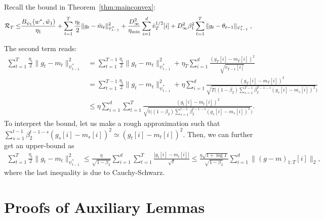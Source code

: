 \documentclass[11pt]{article}
\makeatletter
\renewenvironment{proof}[1][\proofname]{%
   \par\pushQED{\qed}\normalfont%
   \topsep6\p@\@plus6\p@\relax
   \trivlist\item[\hskip\labelsep\bfseries#1]%
   \ignorespaces
}{%
   \popQED\endtrivlist\@endpefalse
}
\theoremstyle{k}
\makeatother
\begin{document}
\begin{proof}
Recall the bound in Theorem~\ref{thm:mainconvex}:
\begin{equation}\notag
\begin{aligned}
\mathcal{R}_T \leq &   \frac{ B_{\psi_1}(w^*, \tilde{w}_{1})}{\eta_1}
+ \sum_{t=1}^T\frac{\eta_t}{2} \| g_t - \tilde{m}_t  \|_{\psi_{t-1}^*}^2  + \frac{D_{\infty}^2}{\eta_{\min}}  \sum_{i=1}^d \hat{v}_{T}^{1/2}[i] + D_{\infty}^2\beta_1^2   \sum_{t=1}^T  \| g_t - \theta_{t-1}  \|_{\psi_{t-1}^*}\;,
\end{aligned}
\end{equation}

The second term reads:
\begin{align*}
     \sum_{t=1}^T \frac{\eta_t}{2} \|g_t - m_t  \|_{\psi_{t-1}^*}^2 & =\sum_{t=1}^{T-1} \frac{\eta_t}{2} \|g_t - m_t  \|_{\psi_{t-1}^*}^2   + \eta_T \sum_{i=1}^d \frac{ (g_{T}[i] - m_{T}[i])^2 }{ \sqrt{ v_{T-1}[i]} }\\
    &=\sum_{t=1}^{T-1} \frac{\eta_t}{2} \|g_t - m_t  \|_{\psi_{t-1}^*}^2 + \eta \sum_{i=1}^d \frac{ (g_{T}[i] - m_{T}[i])^2 }{ \sqrt{ T \big( (1-\beta_2) \sum_{s=1}^{T-1} \beta_2^{T-1-s} (g_{s}[i] - m_{s}[i])^2 } \big) }\\
    &\leq   \eta \sum_{i=1}^d \sum_{t=1}^T \frac{ (g_{t}[i] - m_{t}[i])^2 }{ \sqrt{ t \big( (1-\beta_2) \sum_{s=1}^{t-1} \beta_2^{t-1-s} (g_{s}[i] - m_{s}[i])^2 } \big) }.
\end{align*}
To interpret the bound, let us make a rough approximation such that
$\sum_{s=1}^{t-1} \beta_2^{t-1-s} (g_{s}[i] - m_{s}[i])^2  \simeq (g_{t}[i] - m_t[i])^2 $.
Then, we can further get an upper-bound as 
\begin{align*}
    \sum_{t=1}^T \frac{\eta_t}{2} \|g_t - m_t  \|_{\psi_{t-1}^*}^2 \leq
    \frac{\eta}{\sqrt{1 - \beta_2}} \sum_{i=1}^d \sum_{t=1}^{T} \frac{ | g_{t}[i] - m_{t}[i] | }{ \sqrt{t} }\leq \frac{\eta \sqrt{1 + \log T}}{\sqrt{1 - \beta_2}} \sum_{i=1}^d \| (g-m)_{1:T}[i] \|_2 ,
\end{align*}
where the last inequality is due to Cauchy-Schwarz.


\end{proof}

\clearpage
\section{Proofs of Auxiliary Lemmas}
\end{document}
